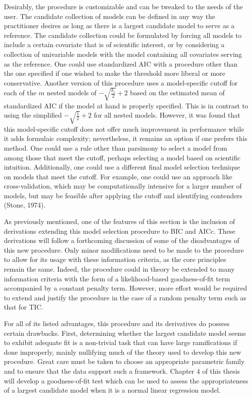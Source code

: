 		Desirably, the procedure is customizable and can be tweaked to the needs of the user. The candidate collection of models can be defined in any way the practitioner desires
		as long as there is a largest candidate model to serve as a reference. The candidate collection could be formulated by forcing all models to include a certain covariate that is of scientific
		interest, or by considering a collection of univariable models with the model containing all covariates serving as the reference. One could use standardized
		AIC with a procedure other than the one specified if one wished to make the threshold more liberal or more conservative. Another version of this procedure uses a model-specific
		cutoff for each of the $m$ nested models of $-\sqrt{\frac{k_i}{2}} + 2$ based on the estimated mean of standardized AIC if the model at hand is properly specified.
		This is in contrast to using the simplified $-\sqrt{\frac{1}{2}} + 2$ for all nested models. However, it was found that this model-specific cutoff does not offer much improvement in performance
		while it adds formulaic complexity; nevertheless, it remains an option if one prefers this method. One could use a rule other than parsimony to select a model
		from among those that meet the cutoff, perhaps selecting a model based on scientific intuition. Additionally, one could use a different final model selection technique on
		models that meet the cutoff. For example, one could use an approach like cross-validation, which may be computationally intensive for a larger number of models, but may be feasible after
		applying the cutoff and identifying contenders (Stone, 1974).

		As previously mentioned, one of the features of this section is the inclusion of derivations extending this model selection procedure to BIC and
		AICc. These derivations will follow a forthcoming discussion of some of the disadvantages of this new procedure. Only minor modifications need to be made to the
		procedure to allow for its usage with these information criteria, as the core principles remain the same. Indeed, the procedure could in theory be extended to
		many information criteria with the form of a likelihood-based goodness-of-fit term accompanied by a constant penalty term. However, more effort would be required
		to extend and justify the procedure in the case of a random penalty term such as that for TIC.

		For all of its listed advantages, this procedure and its derivatives do possess certain drawbacks. First, determining whether the largest candidate
		model seems to exhibit adequate fit is a non-trivial task that can have large ramifications if done improperly, mainly nullifying much of the theory used to develop this
		new procedure. Great care must be taken to choose an appropriate parametric family and to ensure that the data support such a framework. Chapter 4 of this thesis will
		develop a goodness-of-fit test which can be used to assess the appropriateness of a largest candidate model when it is a normal linear regression model.

